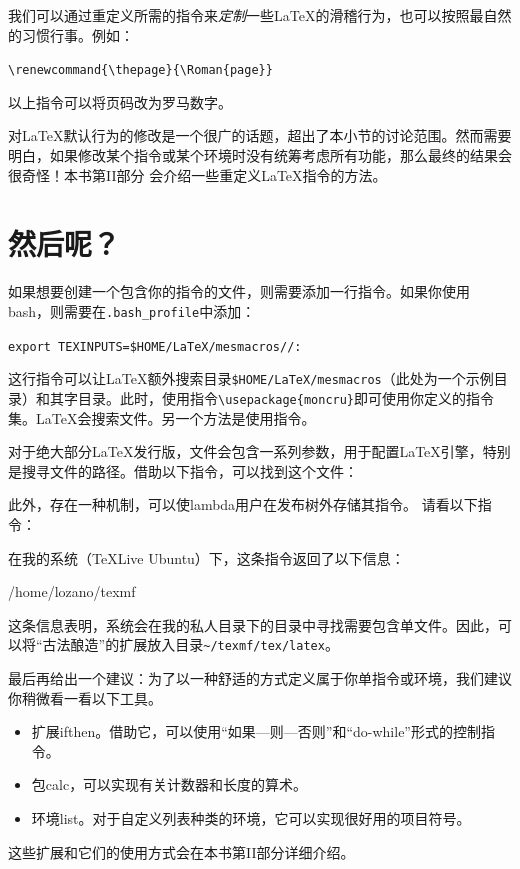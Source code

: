 我们可以通过重定义所需的指令来\emph{定制}一些\LaTeX 的滑稽行为，也可以按照最自然的习惯行事。例如：

\begin{dmd}
\verb|\renewcommand{\thepage}{\Roman{page}}|
\end{dmd}

以上指令可以将页码改为罗马数字。%

\begin{exclamation}
对\LaTeX 默认行为的修改是一个很广的话题，超出了本小节的讨论范围。然而需要明白，如果修改某个指令或某个环境时没有统筹考虑所有功能，那么最终的结果会很奇怪！本书第II部分%
会介绍一些重定义\LaTeX 指令的方法。
\end{exclamation}

\section{然后呢？}

如果想要创建一个包含你的指令的文件，则需要添加一行指令。如果你使用\textsf{bash}，则需要在\verb+.bash_profile+中添加：

\begin{dmd}
\verb|export TEXINPUTS=$HOME/LaTeX/mesmacros//:|
\end{dmd}

这行指令可以让\LaTeX 额外搜索目录\verb|$HOME/LaTeX/mesmacros|（此处为一个示例目录）和其字目录。此时，使用指令\verb|\usepackage{moncru}|即可使用你定义的指令集。\LaTeX 会搜索文件。另一个方法是使用指令\verb||。

对于绝大部分\LaTeX 发行版，文件会包含一系列参数，用于配置\LaTeX 引擎，特别是搜寻文件的路径。借助以下指令，可以找到这个文件：


此外，存在一种机制，可以使lambda用户在发布树外存储其指令。%
请看以下指令：


在我的系统（\TeX Live Ubuntu）下，这条指令返回了以下信息：

\begin{dmd}
/home/lozano/texmf
\end{dmd}

这条信息表明，系统会在我的私人目录下的目录中寻找需要包含单文件。因此，可以将“古法酿造”的扩展放入目录\verb+~/texmf/tex/latex+。

最后再给出一个建议：为了以一种舒适的方式定义属于你单指令或环境，我们建议你稍微看一看以下工具。

\begin{itemize}
  \item 扩展\textsf{ifthen}。借助它，可以使用“如果—则—否则”和“do-while”形式的控制指令。
  \item 包\textsf{calc}，可以实现有关计数器和长度的算术。
  \item 环境\textsf{list}。对于自定义列表种类的环境，它可以实现很好用的项目符号。
\end{itemize}

这些扩展和它们的使用方式会在本书第II部分详细介绍。%